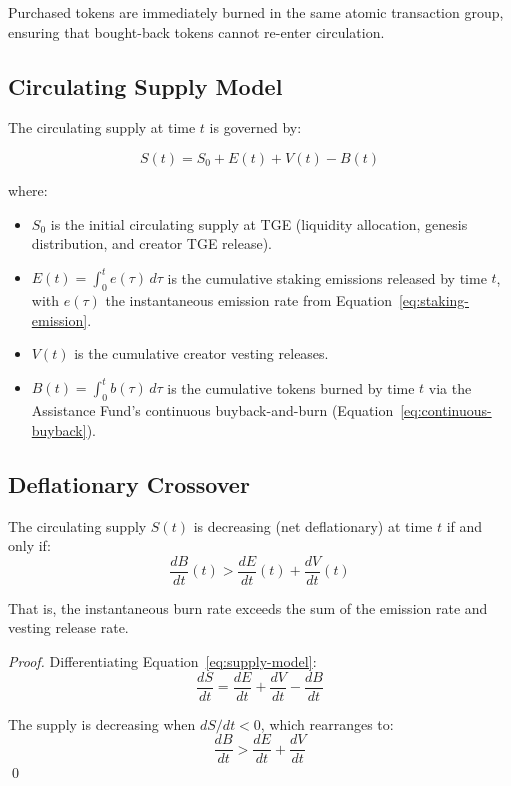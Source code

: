 Purchased tokens are immediately burned in the same atomic transaction group,
ensuring that bought-back tokens cannot re-enter circulation.

\subsection{Circulating Supply Model}
\label{subsec:supply-model}

The circulating supply at time $t$ is governed by:

\begin{equation}
  S(t) = S_0 + E(t) + V(t) - B(t)
  \label{eq:supply-model}
\end{equation}

where:
\begin{itemize}
  \item $S_0$ is the initial circulating supply at TGE (liquidity allocation,
    genesis distribution, and creator TGE release).
  \item $E(t) = \int_0^t e(\tau) \, d\tau$ is the cumulative staking emissions
    released by time $t$, with $e(\tau)$ the instantaneous emission rate from
    Equation~\eqref{eq:staking-emission}.
  \item $V(t)$ is the cumulative creator vesting releases.
  \item $B(t) = \int_0^t b(\tau) \, d\tau$ is the cumulative tokens burned by
    time $t$ via the Assistance Fund's continuous buyback-and-burn
    (Equation~\eqref{eq:continuous-buyback}).
\end{itemize}

\subsection{Deflationary Crossover}
\label{subsec:deflationary}

\begin{theorem}
\label{thm:deflationary}
The circulating supply $S(t)$ is decreasing (net deflationary) at time $t$ if
and only if:
\begin{equation}
  \frac{dB}{dt}(t) > \frac{dE}{dt}(t) + \frac{dV}{dt}(t)
  \label{eq:deflation-condition}
\end{equation}

That is, the instantaneous burn rate exceeds the sum of the emission rate and
vesting release rate.
\end{theorem}

\begin{proof}
Differentiating Equation~\eqref{eq:supply-model}:
\begin{equation}
  \frac{dS}{dt} = \frac{dE}{dt} + \frac{dV}{dt} - \frac{dB}{dt}
  \label{eq:ds-dt}
\end{equation}

The supply is decreasing when $dS/dt < 0$, which rearranges to:
\begin{equation}
  \frac{dB}{dt} > \frac{dE}{dt} + \frac{dV}{dt}
  \label{eq:deflation-rearranged}
\end{equation}
\qed
\end{proof}

